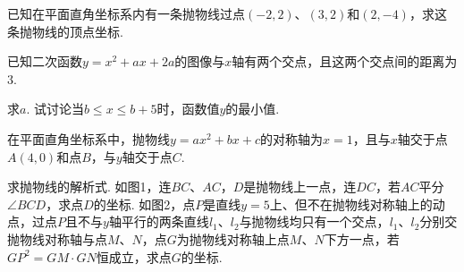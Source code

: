 \documentclass[10pt]{article}
\begin{document}
\begin{questions}{\answeringintroduction}
    \question 已知在平面直角坐标系内有一条抛物线过点$(-2,2)$、$(3,2)$和$(2,-4)$，求这条抛物线的顶点坐标.
    \question %
    \begin{subquestions}
        \subquestion %
        \subquestion %
    \end{subquestions}
    \question 已知二次函数$y=x^2+ax+2a$的图像与$x$轴有两个交点，且这两个交点间的距离为$3$.
    \begin{subquestions}
        \subquestion 求$a$.
        \subquestion 试讨论当$b \le x \le b+5$时，函数值$y$的最小值.
    \end{subquestions}
    \question
    \begin{subquestions}
        \subquestion %
        \subquestion %
    \end{subquestions}
    \question %
    \begin{subquestions}
        \subquestion %
        \subquestion %
    \end{subquestions}
    \question %
    \begin{subquestions}
        \subquestion %
        \subquestion %
        \subquestion %
    \end{subquestions}
    \question %
    \begin{subquestions}
        \subquestion %
        \subquestion %
        \subquestion %
    \end{subquestions}
    \question 在平面直角坐标系中，抛物线$y=ax^2+bx+c$的对称轴为$x=1$，且与$x$轴交于点$A(4,0)$和点$B$，与$y$轴交于点$C$.
    \begin{subquestions}
        \subquestion 求抛物线的解析式.
        \subquestion 如图1，连$BC$、$AC$，$D$是抛物线上一点，连$DC$，若$AC$平分$\angle BCD$，求点$D$的坐标.
        \subquestion 如图2，点$P$是直线$y=5$上、但不在抛物线对称轴上的动点，过点$P$且不与$y$轴平行的两条直线$l_1$、$l_2$与抛物线均只有一个交点，$l_1$、$l_2$分别交抛物线对称轴与点$M$、$N$，点$G$为抛物线对称轴上点$M$、$N$下方一点，若${GP}^2=GM \cdot GN$恒成立，求点$G$的坐标.
    \end{subquestions}
    \begin{figure}[htb]
        \centering
\end{figure}
\end{questions}
\end{document}
